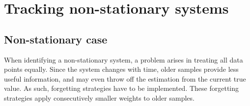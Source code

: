 \chapter{Tracking non-stationary systems}

\section{Non-stationary case}

When identifying a non-stationary system, a problem arises in treating all data points equally.
Since the system changes with time, older samples provide less useful information, and may even
throw off the estimation from the current true value. As such, forgetting strategies have to be implemented.
These forgetting strategies apply consecutively smaller weights to older samples.
